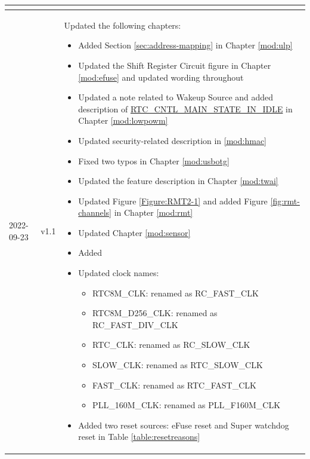 \begin{longtable}[l]{ | m{2cm} | m{1.5cm} | m{12cm} | }
\begin{itemize}
    \end{itemize}
    \\\hline
    2022-09-23     & v1.1 &
    Updated the following chapters:
    \begin{itemize}
        \item Added Section \ref{sec:address-mapping} in Chapter \ref{mod:ulp} \textit{\nameref{mod:ulp}}
        \item Updated the Shift Register Circuit figure in Chapter \ref{mod:efuse} \textit{\nameref{mod:efuse}} and updated wording throughout
        \item Updated a note related to Wakeup Source and added description of \hyperref[fielddesc:RTCCNTLMAINSTATEINIDLE]{RTC\_CNTL\_MAIN\_STATE\_IN\_IDLE} in Chapter \ref{mod:lowpowm} \textit{\nameref{mod:lowpowm}}
        \item Updated security-related description in \ref{mod:hmac} \textit{\nameref{mod:hmac}}
        \item Fixed two typos in Chapter \ref{mod:usbotg} \textit{\nameref{mod:usbotg}}
        \item Updated the feature description in Chapter \ref{mod:twai} \textit{\nameref{mod:twai}}
        \item Updated Figure \ref{Figure:RMT2-1} and added Figure \ref{fig:rmt-channels} in Chapter \ref{mod:rmt} \textit{\nameref{mod:rmt}}
        \item Updated Chapter \ref{mod:sensor} \textit{\nameref{mod:sensor}}
        \item Added \textit{\nameref{sec:resources}}
        \item Updated clock names:
        \begin{itemize}
            \item RTC8M\_CLK: renamed as RC\_FAST\_CLK
            \item RTC8M\_D256\_CLK: renamed as RC\_FAST\_DIV\_CLK
            \item RTC\_CLK: renamed as RC\_SLOW\_CLK
            \item SLOW\_CLK: renamed as RTC\_SLOW\_CLK
            \item FAST\_CLK: renamed as RTC\_FAST\_CLK
            \item PLL\_160M\_CLK: renamed as PLL\_F160M\_CLK%
        \end{itemize}
        \item Added two reset sources: eFuse reset and Super watchdog reset in Table \ref{table:resetreasons}
    \vspace{-1em}
    \end{itemize}
    \\\hline


\end{longtable}

